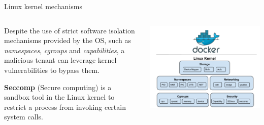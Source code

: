 \documentclass{beamer}
\begin{document}
\begin{frame}{Linux kernel mechanisms}

\begin{columns}
\begin{column}{0.45\textwidth}
Despite the use of strict software isolation mechanisms provided by the OS, such as \emph{namespaces}, \emph{cgroups} and \emph{capabilities}, a malicious tenant can leverage kernel vulnerabilities to bypass them.
\vspace{0.35cm}

\textbf{Seccomp} (Secure computing) is a sandbox tool in the Linux kernel to restrict a process from invoking certain system calls.
\end{column}
\begin{column}{0.55\textwidth}
\includegraphics[width=\textwidth]
{assets/linux-kernel}
\end{column}
\end{columns}
\end{frame}
\end{document}
